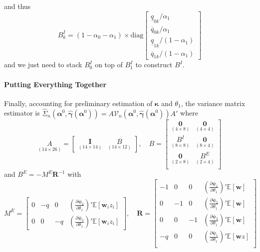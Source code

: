 and thus
\[
  B^I_k = (1 - \alpha_0 - \alpha_1) \times \mbox{diag} \left[
  \begin{array}{l}
    \underline{q}_{0k} / \alpha_1\\
    \overline{q}_{0k} / \alpha_1\\
    \underline{q}_{1k} / (1 - \alpha_1)\\
    \overline{q}_{1k} / (1 - \alpha_1)
  \end{array}
\right]
\]
and we just need to stack $B^I_0$ on top of $B^I_1$ to construct $B^I$.

\paragraph{Putting Everything Together}
Finally, accounting for preliminary estimation of $\boldsymbol{\kappa}$ and $\theta_1$, the variance matrix estimator is $\widehat{\Sigma}_n\left(\boldsymbol{\alpha}^0, \widehat{\boldsymbol{\gamma}}(\boldsymbol{\alpha}^0)\right) = A \widehat{\mathcal{V}}_n \left(\boldsymbol{\alpha}^0, \widehat{\boldsymbol{\gamma}}(\boldsymbol{\alpha}^0)\right) A'$ where 
\[
  \underset{(14 \times 26)}{A} = \left[
\begin{array}{cc}
  \underset{(14\times 14)}{\mathbf{I}} & \underset{(14 \times 12)}{B}
\end{array}
\right], \quad
  B = \left[
  \begin{array}{cc}
    \underset{(4\times 8)}{\mathbf{0}} & \underset{(4\times 4)}{\mathbf{0}} \\
    \underset{(8\times 8)}{B^I} & \underset{(8\times 4)}{\mathbf{0}} \\
    \underset{(2 \times 8)}{\mathbf{0}} & \underset{(2\times 4)}{B^E} \\
  \end{array}
\right]
\]
and $B^{E} = -M^E \mathbf{R}^{-1}$ with
\[
  M^E = \left[ 
    \begin{array}{cccc} 
      0 & -q & 0 & \displaystyle\left( \frac{\partial \boldsymbol{\psi}_2}{\partial \theta_1} \right)' \mathbb{E}[\mathbf{w}_iz_i]\\ 
      0 & 0 & -q & \displaystyle\left( \frac{\partial \boldsymbol{\psi}_3}{\partial \theta_1} \right)' \mathbb{E}[\mathbf{w}_iz_i] 
  \end{array} \right], \quad
\mathbf{R} = \left[
\begin{array}{rrrr}
  -1 & 0 & 0 
  & \displaystyle \left(\frac{\partial \boldsymbol{\psi}_1}{\partial \theta_1}\right)'\mathbb{E}[\mathbf{w}]\\
   0 & -1 & 0 & \displaystyle \left(\frac{\partial \boldsymbol{\psi}_2}{\partial \theta_1}\right)'\mathbb{E}[\mathbf{w}]\\
   0 & 0 & -1 & \displaystyle \left(\frac{\partial \boldsymbol{\psi}_3}{\partial \theta_1}\right)'\mathbb{E}[\mathbf{w}]\\
   -q & 0 & 0 &  \displaystyle \left(\frac{\partial \boldsymbol{\psi}_1}{\partial \theta_1}\right)'\mathbb{E}[\mathbf{w}z]\\
\end{array}
\right]
\]
